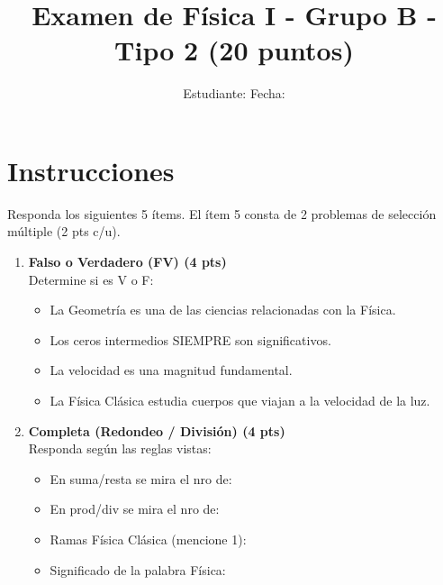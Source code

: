 \documentclass[a4paper,12pt]{article}
\title{Examen de Física I - Grupo B - Tipo 2 (20 puntos)}
\author{Estudiante: \underline{\hspace{6cm}} \quad Fecha: \underline{\hspace{3cm}}}
\date{}
\begin{document}
\maketitle

\section*{Instrucciones}
Responda los siguientes 5 ítems. El ítem 5 consta de 2 problemas de selección múltiple (2 pts c/u).

\begin{enumerate}[label=\textbf{Item \arabic*:}, leftmargin=*]

    \item \textbf{Falso o Verdadero (FV) (4 pts)} \\
    Determine si es V o F:
    \begin{itemize}
        \item[\underline{\hspace{1cm}}] La Geometría es una de las ciencias relacionadas con la Física.
        \item[\underline{\hspace{1cm}}] Los ceros intermedios SIEMPRE son significativos.
        \item[\underline{\hspace{1cm}}] La velocidad es una magnitud fundamental.
        \item[\underline{\hspace{1cm}}] La Física Clásica estudia cuerpos que viajan a la velocidad de la luz.
    \end{itemize}

    \item \textbf{Completa (Redondeo / División) (4 pts)} \\
    Responda según las reglas vistas:
    \begin{itemize}
        \item En suma/resta se mira el nro de: \underline{\hspace{3cm}}
        \item En prod/div se mira el nro de: \underline{\hspace{3cm}}
        \item Ramas Física Clásica (mencione 1): \underline{\hspace{3cm}}
        \item Significado de la palabra Física: \underline{\hspace{3cm}}
    \end{itemize}


\end{enumerate}
\end{document}
